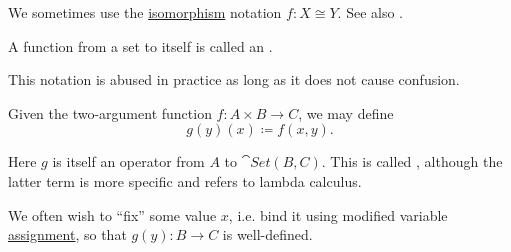 \begin{definition}
\begin{defenum}
    We sometimes use the \hyperref[def:morphism_invertibility/isomorphism]{isomorphism} notation \( f: X \cong Y \). See also .
  \end{defenum}
\end{definition}

\begin{definition}\label{def:endofunction}
  A function from a set to itself is called an .
\end{definition}

\begin{definition}\label{def:currying}
  This notation is abused in practice as long as it does not cause confusion.

  Given the two-argument function \( f: A \times B \to C \), we may define
  \begin{equation*}
    g(y)(x) \coloneqq f(x, y).
  \end{equation*}

  Here \( g \) is itself an operator from \( A \) to \( \cat{Set}(B, C) \). This is called , although the latter term is more specific and refers to lambda calculus.

  We often wish to \enquote{fix} some value \( x \), i.e. bind it using modified variable \hyperref[def:first_order_valuation/variable_assignment]{assignment}, so that \( g(y): B \to C \) is well-defined.
\end{definition}

